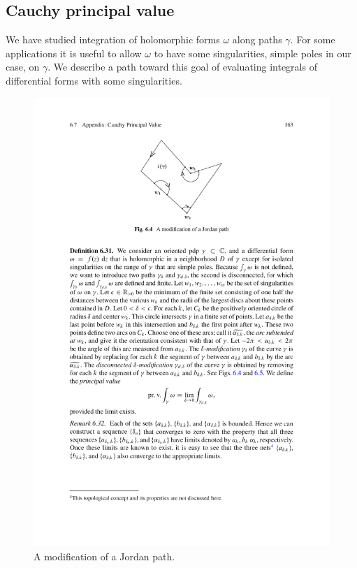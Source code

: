 \subsection{Cauchy principal value}
We have studied integration of holomorphic forms $\omega$ along paths $\gamma$. For some applications it is useful to allow $\omega$ to have some singularities, simple poles in our case, on $\gamma$. We describe a path toward this goal of evaluating integrals of differential forms with some singularities.
\begin{figure}[htbp]
\centering
\includegraphics{pictures/modification}
\caption{A modification of a Jordan path.}
\end{figure}

